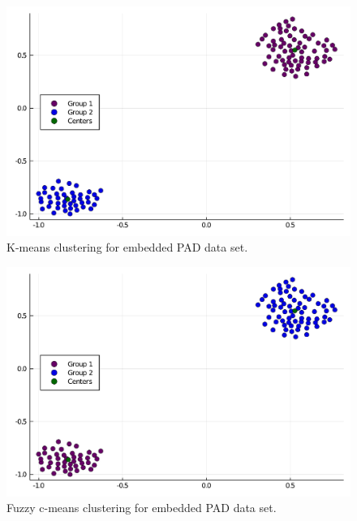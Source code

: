 \documentclass[conference]{IEEEtran}
\theoremstyle{definition}
\theoremstyle{remark}
\theoremstyle{remark}
\begin{document}
\begin{figure}[t]
  \centering
  \includegraphics[scale=.35]{figs/real/emb-k-means}
  \caption{K-means clustering for embedded PAD data set.}
  \label{fig:embdsk}
\end{figure}

\begin{figure}[t]
  \centering
  \includegraphics[scale=.35]{figs/real/emb-fc-means}
  \caption{Fuzzy c-means clustering for embedded PAD data set.}
  \label{fig:embdsfc}
\end{figure}
\end{document}
